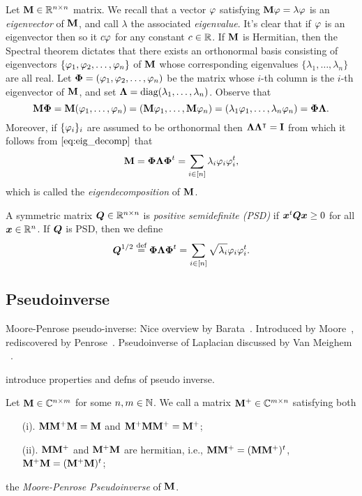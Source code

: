 Let $\vb{M}\in\mathbb{R}^{n\times n}$ matrix. We recall that a vector $\varphi$ satisfying $\vb{M}\varphi=\lambda\varphi$ is an \emph{eigenvector} of $\vb{M}$, and call $\lambda$ the associated \emph{eigenvalue}. It's clear that if $\varphi$ is an eigenvector then so it $c\varphi$ for any constant $c\in \mathbb{R}$. If $\vb{M}$ is Hermitian, then the Spectral theorem dictates that there exists an orthonormal basis consisting of eigenvectors $\{\varphi_1,\varphi_2,\dots,\varphi_n\}$ of $\vb{M}$ whose corresponding eigenvalues $\{\lambda_1,\dots,\lambda_n\}$ are all real. Let $\boldsymbol{\Phi}=(\varphi_1,\varphi_2,\dots,\varphi_n)$ be the matrix whose $i$-th column is the $i$-th eigenvector of $\vb{M}$, and set $\vb{\Lambda}=\text{diag}(\lambda_1,\dots,\lambda_n)$. Observe that 
\begin{equation}
\label{eq:eig_decomp}
\vb{M}\boldsymbol{\Phi}=\vb{M}(\varphi_1,\dots,\varphi_n)=(\vb{M}\varphi_1,\dots,\vb{M}\varphi_n)=(\lambda_1\varphi_1,\dots,\lambda_n\varphi_n)=\boldsymbol{\Phi}\vb{\Lambda}.
\end{equation}
Moreover, if $\{\varphi_i\}_i$ are assumed to be orthonormal then $\vb{\Lambda}\vb{\Lambda}^\intercal=\vb{I}$ from which it follows from $\eqref{eq:eig_decomp}$ that \begin{equation}
    \label{eq:eig_decomp2}
    \vb{M}=\boldsymbol{\Phi}\vb{\Lambda}\boldsymbol{\Phi}^t = \sum_{i\in[n]}\lambda_i\varphi_i\varphi_i^t,
\end{equation}
which is called the \emph{eigendecomposition} of $\vb{M}$. 

A symmetric matrix $\vb*{Q}\in\mathbb{R}^{n\times n}$ is \emph{positive semidefinite (PSD)} if $\vb*{x}^t\vb*{{Q}}\vb*{x} \geq 0$ for all $\vb*{x}\in\mathbb{R}^n$. If $\vb*{{Q}}$ is PSD, then we define 
\begin{equation*}
    \vb*{{Q}}^{1/2} \overset{\text{def}}{=} \boldsymbol{\Phi}\vb{\Lambda}\boldsymbol{\Phi}^t = \sum_{i\in[n]}\sqrt{\lambda_i}\varphi_i\varphi_i^t.
\end{equation*}

\subsection{Pseudoinverse}
Moore-Penrose pseudo-inverse: Nice overview by Barata~\cite{barata2012moore}. Introduced by Moore~\cite{moore1920reciprocal}, rediscovered by Penrose~\cite{penrose1955generalized,penrose1956best}. Pseudoinverse of Laplacian discussed by Van Meighem \etal~\cite{van2017pseudoinverse}. 

\TODO introduce properties and defns of pseudo inverse.

\begin{definition}
\label{def:pseudoinverse}
Let $\vb{M}\in\mathbb{C}^{n\times m}$ for some $n,m\in\mathbb{N}$. We call a matrix $\vb{M}^+\in\mathbb{C}^{m\times n}$ satisfying both
\begin{enumerate}
    \item[(i).] $\vb{M}\vb{M}^+\vb{M}=\vb{M}$ and $\vb{M}^+\vb{M}\vb{M}^+=\vb{M}^+$;
    \item[(ii).] $\vb{M}\vb{M}^+$ and $\vb{M}^+\vb{M}$ are hermitian, i.e., $\vb{M}\vb{M}^+=(\vb{M}\vb{M}^+)^t $, $\vb{M}^+\vb{M}=(\vb{M}^+\vb{M})^t$; 
\end{enumerate}
the \emph{Moore-Penrose Pseudoinverse} of $\vb{M}$. 
\end{definition}

